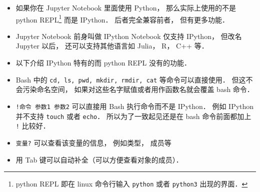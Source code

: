 
\begin{issues}
\issueDraft
\end{issues}

\begin{itemize}
\item 如果你在 Jupyter Notebook 里面使用 Python， 那么实际上使用的不是 python REPL\footnote{python REPL 即在 linux 命令行输入 \verb|python| 或者 \verb|python3| 出现的界面．} 而是 IPython． 后者完全兼容前者， 但有更多功能．
\item Jupyter Notebook 前身叫做 IPython Notebook 仅支持 IPython， 但改名 Jupyter 以后， 还可以支持其他语言如 Julia， R， C++ 等．
\item 以下介绍 IPython 特有的而 python REPL 没有的功能．
\item Bash 中的 \verb|cd, ls, pwd, mkdir, rmdir, cat| 等命令可以直接使用． 但这不会污染命名空间， 如果对这些名字赋值或者用作函数名就会覆盖 bash 命令．
\item \verb|!命令 参数1 参数2| 可以直接用 Bash 执行命令而不是 IPython． 例如 IPython 并不支持 \verb|touch| 或者 \verb|echo|． 所以为了一致起见还是在 bash 命令前面都加上 \verb|!| 比较好．
\item \verb|变量?| 可以查看该变量的信息， 例如类型， 成员等
\item 用 Tab 键可以自动补全（可以方便查看对象的成员）．
\end{itemize}
